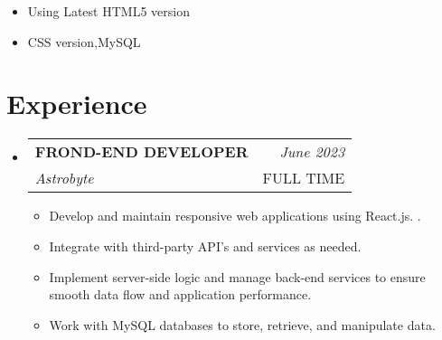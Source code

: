 \documentclass[a4paper,11pt]{article}
\makeatletter
\newcommand{\resumeSubheading}[4]{
\vspace{0.5mm}\item
    \begin{tabular*}{0.98\textwidth}[t]{l@{\extracolsep{\fill}}r}
        \textbf{#1} & \textit{\footnotesize{#4}} \\
        \textit{\footnotesize{#3}} &  \footnotesize{#2}\\
    \end{tabular*}
    \vspace{-2.4mm}
}
\newcommand{\resumeSubHeadingListStart}{\begin{itemize}[leftmargin=*,labelsep=0mm]}
\newcommand{\resumeItemListStart}{\begin{justify}\begin{itemize}[leftmargin=3ex, rightmargin=2ex, noitemsep,labelsep=1.2mm,itemsep=0mm]\small}
\newcommand{\resumeSubHeadingListEnd}{\end{itemize}\vspace{2mm}}
\newcommand{\resumeItemListEnd}{\end{itemize}\end{justify}\vspace{-2mm}}
\makeatother
\begin{document}
      \resumeItemListStart
        \item {Using Latest HTML5  version}
        \item {CSS version,MySQL}
    \resumeItemListEnd
    \vspace{-2mm}



\section{\textbf{Experience}}
  \resumeSubHeadingListStart
    \resumeSubheading
      {FROND-END DEVELOPER}{FULL TIME}
      {Astrobyte}{ June 2023}
      \vspace{-2.0mm}
      \resumeItemListStart
    \item {Develop and maintain responsive web applications using React.js. .}
    \item {Integrate with third-party API's and services as needed. }
    \item {Implement server-side logic and manage back-end services to ensure smooth data flow and application performance.}
    \item {Work with MySQL databases to store, retrieve, and manipulate data.}
    \resumeItemListEnd
    
    \vspace{3.0mm} 
  \resumeSubHeadingListEnd
\vspace{-5.5mm}







\end{document}
